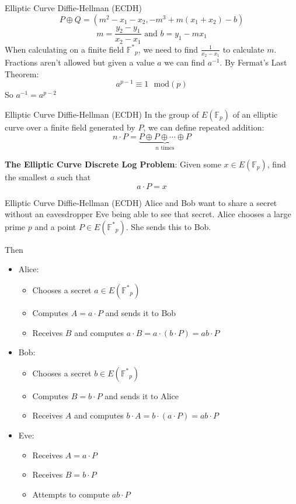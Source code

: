 \documentclass{beamer}
\begin{document}
\begin{frame}{Elliptic Curve Diffie-Hellman (ECDH)}
    \[
         P \oplus Q = (m^2 - x_1 - x_2, -m^3+m(x_1+x_2)-b)
    \]
    \[
        m = \frac{y_2 - y_1}{x_2 - x_1} \text{ and } b = y_1 - mx_1
    \]
    When calculating on a finite field $\mathbb{F^*}_p$, we need to find $\frac{1}{x_2-x_1}$ to calculate $m$. Fractions aren't allowed but given a value $a$ we can find $a^{-1}$. By Fermat's Last Theorem:
    \[
        a^{p-1} \equiv 1 \text{ } \mathrm{mod}(p)
    \]
    So $a^{-1} = a^{p - 2}$
\end{frame}

\begin{frame}{Elliptic Curve Diffie-Hellman (ECDH)}
    In the group of $E(\mathbb{F}_p)$ of an elliptic curve over a finite field generated by $P$, we can define repeated addition:
    \[
        n\cdot P = \underbrace{P \oplus P \oplus \cdots \oplus P}_{n \text{ times} }
    \]

    \textbf{The Elliptic Curve Discrete Log Problem}: Given some $x \in E(\mathbb{F}_p)$, find the smallest $a$ such that 
    \[
        a\cdot P = x
    \]
\end{frame}

\begin{frame}{Elliptic Curve Diffie-Hellman (ECDH)}
    Alice and Bob want to share a secret without an eavesdropper Eve being able to see that secret. Alice chooses a large prime $p$ and a point $P \in E(\mathbb{F^*}_p)$. She sends this to Bob.

    Then 
    \begin{itemize}
        \item Alice:
        \begin{itemize}
            \item Chooses a secret $a \in E(\mathbb{F^*}_p)$
            \item Computes $A = a \cdot P$ and sends it to Bob
            \item Receives $B$ and computes $a \cdot B=a \cdot (b\cdot P) = ab \cdot P$
        \end{itemize}
        \item Bob:
        \begin{itemize}
            \item Chooses a secret $b \in E(\mathbb{F^*}_p)$
            \item Computes $B = b \cdot P$ and sends it to Alice
            \item Receives $A$ and computes $b \cdot A=b \cdot (a\cdot P) = ab \cdot P$
        \end{itemize}
        \item Eve:
        \begin{itemize}
            \item Receives $A=a \cdot P$
            \item Receives $B=b \cdot P$
            \item Attempts to compute $ab \cdot P$
        \end{itemize}
    \end{itemize}
\end{frame}
\end{document}

